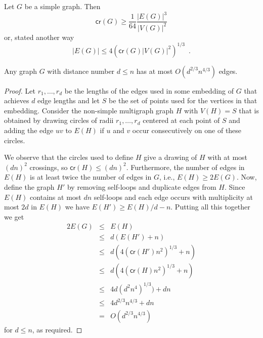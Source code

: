 \documentclass{article}
\newcommand{\cn}{\mathsf{cr}}
\begin{document}
\begin{lem}
Let $G$ be a simple graph.  Then 
\[  \cn (G) \ge \frac{1}{64}\frac{|E(G)|^3}{|V(G)|^2}
\]
or, stated another way 
\[
  |E(G)| \le 4\left(\cn(G)|V(G)|^2\right)^{1/3} \enspace .
\]
\end{lem}

\begin{thm}
Any graph $G$ with distance number $d\le n$ has at most
$O(d^{2/3}n^{4/3})$ edges.
\end{thm}

\begin{proof} 
Let $r_1,\ldots,r_d$ be the lengths of the edges used in some
embedding of $G$ that achieves $d$ edge lengths and let $S$ be the set
of points used for the vertices in that embedding. 
Consider the non-simple multigraph graph $H$ with $V(H)=S$ that is
obtained by drawing circles of radii $r_1,\ldots,r_d$ centered at each
point of $S$ and adding the edge $uv$ to $E(H)$ if $u$ and $v$ occur
consecutively on one of these circles.

We observe that the circles used to define $H$ give a drawing of $H$
with at most $(dn)^2$ crossings, so $\cn(H)\le (dn)^2$. Furthermore,
the number of edges in $E(H)$ is at least twice the number of edges in
$G$, i.e., $E(H) \ge 2E(G)$.  Now, define the graph $H'$ by removing
self-loops and duplicate edges from $H$.  Since $E(H)$ contains at
most $dn$ self-loops and each edge occurs with multiplicity at most
$2d$ in $E(H)$ we have $E(H') \ge E(H)/d - n$.  Putting all this
together we get
\begin{eqnarray*}
   2E(G) &\le& E(H) \\
         &\le& d(E(H')+n) \\
         &\le& d\left(4\left(\cn(H') n^2\right)^{1/3}+n\right) \\
         &\le& d\left(4\left(\cn(H) n^2\right)^{1/3}+n\right) \\
         &\le& 4d(d^2n^4)^{1/3})+dn \\
         &\le& 4d^{2/3}n^{4/3}+dn \\
         & = & O(d^{2/3}n^{4/3})
\end{eqnarray*}
for $d\le n$, as required.
\end{proof}
\end{document}
